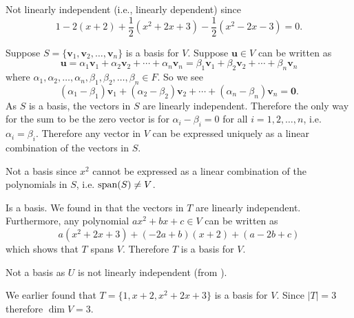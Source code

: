 \begin{questions}
\begin{partquestions}{\alph*}
        \item Not linearly independent (i.e., linearly dependent) since
        \[
            1 - 2(x+2) + \frac12(x^2 + 2x + 3) - \frac12(x^2 - 2x - 3) = 0.
        \]
    \end{partquestions}

    \item Suppose $S = \{\textbf{v}_1, \textbf{v}_2, \dots, \textbf{v}_n\}$ is a basis for $V$. Suppose $\textbf{u} \in V$ can be written as
    \[
        \textbf{u} = \alpha_1\textbf{v}_1 + \alpha_2\textbf{v}_2 + \cdots + \alpha_n\textbf{v}_n = \beta_1\textbf{v}_1 + \beta_2\textbf{v}_2 + \cdots + \beta_n\textbf{v}_n
    \]
    where $\alpha_1, \alpha_2, \dots, \alpha_n, \beta_1, \beta_2, \dots, \beta_n \in F$. So we see
    \[
        (\alpha_1 - \beta_1)\textbf{v}_1 + (\alpha_2 - \beta_2)\textbf{v}_2 + \cdots + (\alpha_n - \beta_n)\textbf{v}_n = \textbf{0}.
    \]
    As $S$ is a basis, the vectors in $S$ are linearly independent. Therefore the only way for the sum to be the zero vector is for $\alpha_i - \beta_i = 0$ for all $i = 1, 2, \dots, n$, i.e. $\alpha_i = \beta_i$. Therefore any vector in $V$ can be expressed uniquely as a linear combination of the vectors in $S$.

    \item \begin{partquestions}{\alph*}
        \item Not a basis since $x^2$ cannot be expressed as a linear combination of the polynomials in $S$, i.e. $\mathrm{span}(S) \neq V$.

        \item Is a basis. We found in  that the vectors in $T$ are linearly independent. Furthermore, any polynomial $ax^2 + bx + c \in V$ can be written as
        \[
            a(x^2+2x+3) + (-2a+b)(x+2) + (a-2b+c)
        \]
        which shows that $T$ spans $V$. Therefore $T$ is a basis for $V$.

        \item Not a basis as $U$ is not linearly independent (from ).
    \end{partquestions}

    \item We earlier found that $T = \{1, x + 2, x^2 + 2x + 3\}$ is a basis for $V$. Since $|T| = 3$ therefore $\dim{V} = 3$.
\end{questions}

